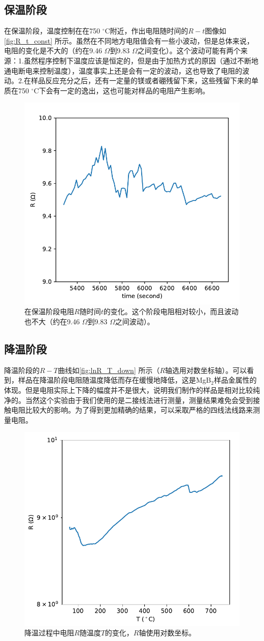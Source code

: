\documentclass[font=default]{mpltx}
\begin{document}
\subsection{保温阶段}
在保温阶段，温度控制在在750 $^\circ$C附近，作出电阻随时间的$R-t$图像如\autoref{fig:R_t_const} 所示。虽然在不同地方电阻值会有一些小波动，但是总体来说，电阻的变化是不大的（约在9.46 $\Omega$到9.83 $\Omega$之间变化）。这个波动可能有两个来源：1.虽然程序控制下温度应该是恒定的，但是由于加热方式的原因（通过不断地通电断电来控制温度），温度事实上还是会有一定的波动，这也导致了电阻的波动。2.在样品反应充分之后，还有一定量的镁或者硼残留下来，这些残留下来的单质在750 $^\circ$C下会有一定的逸出，这也可能对样品的电阻产生影响。
\begin{figure}[h]
  \centering
  \includegraphics[width=0.5\linewidth]{fig/R_t_const.pdf}
  \caption{在保温阶段电阻$R$随时间$t$的变化。这个阶段电阻相对较小，而且波动也不大（约在9.46 $\Omega$到9.83 $\Omega$之间波动）。}
  \label{fig:R_t_const}
\end{figure}
\subsection{降温阶段}
降温阶段的$R-T$曲线如\autoref{fig:lnR_T_down} 所示（$R$轴选用对数坐标轴）。可以看到，样品在降温阶段电阻随温度降低而存在缓慢地降低，这是MgB$_2$样品金属性的体现。但是电阻实际上下降的幅度并不是很大，说明我们制作的样品是相对比较纯净的。当然这个实验由于我们使用的是二接线法进行测量，测量结果难免会受到接触电阻比较大的影响。为了得到更加精确的结果，可以采取严格的四线法线路来测量电阻。
\begin{figure}[h]
  \centering
  \includegraphics[width=0.5\linewidth]{fig/lnR_T_down.pdf}
  \caption{降温过程中电阻$R$随温度$T$的变化，$R$轴使用对数坐标。}
  \label{fig:lnR_T_down}
\end{figure}
\end{document}
